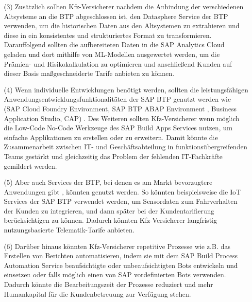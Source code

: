 (3) Zusätzlich sollten Kfz-Versicherer nachdem die Anbindung der verschiedenen Altsysteme an die BTP abgeschlossen ist, den Datasphere Service der BTP verwenden, um die historischen Daten aus den Altsystemen zu extrahieren und diese in ein konsistentes und strukturiertes Format zu transformieren. Darauffolgend sollten die aufbereiteten Daten in die SAP Analytics Cloud geladen und dort mithilfe von ML-Modellen ausgewertet werden, um die Prämien- und Risikokalkulation zu optimieren und anschließend Kunden auf dieser Basis maßgeschneiderte Tarife anbieten zu können.

(4) Wenn individuelle Entwicklungen benötigt werden, sollten die leistungsfähigen Anwendungsentwicklungsfunktionalitäten der SAP BTP genutzt werden wie (SAP Cloud Foundry Environment, SAP BTP ABAP Environment , Business Application Studio, CAP) . Des Weiteren sollten Kfz-Versicherer wenn möglich die Low-Code No-Code Werkzeuge des SAP Build Apps Services nutzen, um einfache Applikationen zu erstellen oder zu erweitern. Damit könnte die Zusammenarbeit zwischen IT- und Geschäftsabteilung in funktionsübergreifenden Teams gestärkt und gleichzeitig das Problem der fehlenden IT-Fachkräfte gemildert werden.

(5) Aber auch Services der BTP, bei denen es am Markt bevorzugtere Anwendungen gibt , könnten genutzt werden. So könnten beispielsweise die IoT Services der SAP BTP verwendet werden, um Sensordaten zum Fahrverhalten der Kunden zu integrieren, und dann später bei der Kundentarifierung berücksichtigen zu können. Dadurch könnten Kfz-Versicherer langfristig  nutzungsbasierte Telematik-Tarife anbieten.

(6) Darüber hinaus könnten Kfz-Versicherer repetitive Prozesse wie z.B. das Erstellen von Berichten automatisieren, indem sie mit dem SAP Build Process Automation Service beaufsichtigte oder  unbeaufsichtigten Bots entwickeln und einsetzen oder falls möglich einen von SAP vordefinierten Bots verwenden. Dadurch könnte die Bearbeitungszeit der Prozesse reduziert und mehr Humankapital für die Kundenbetreuung zur Verfügung stehen.




